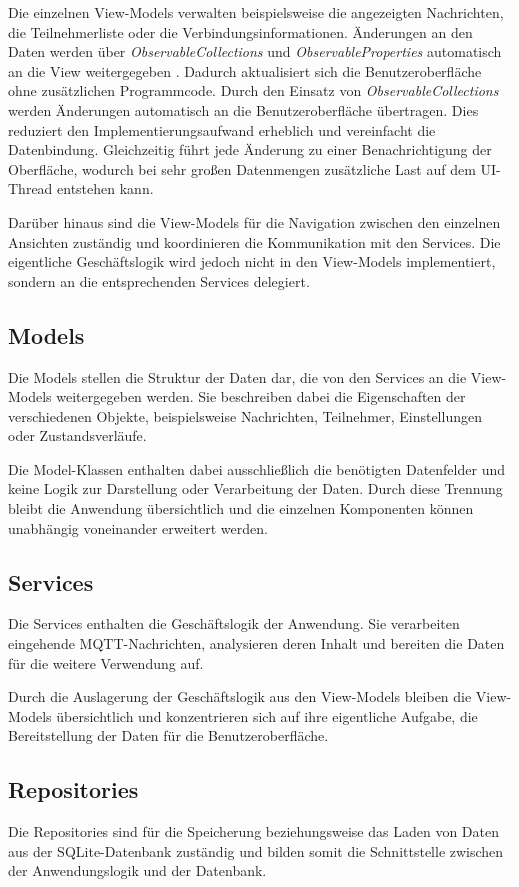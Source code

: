 Die einzelnen View-Models verwalten beispielsweise die angezeigten Nachrichten, die Teilnehmerliste oder die Verbindungsinformationen. Änderungen an den Daten werden über \textit{ObservableCollections} und \textit{ObservableProperties} automatisch an die View weitergegeben \autocite{sergio0694EinfuehrungMVVMToolkitCommunity}. Dadurch aktualisiert sich die Benutzeroberfläche ohne zusätzlichen Programmcode.
Durch den Einsatz von \textit{ObservableCollections} werden Änderungen automatisch an die Benutzeroberfläche übertragen. Dies reduziert den Implementierungsaufwand erheblich und vereinfacht die Datenbindung. Gleichzeitig führt jede Änderung zu einer Benachrichtigung der Oberfläche, wodurch bei sehr großen Datenmengen zusätzliche Last auf dem UI-Thread entstehen kann.

Darüber hinaus sind die View-Models für die Navigation zwischen den einzelnen Ansichten zuständig und koordinieren die Kommunikation mit den Services. Die eigentliche Geschäftslogik wird jedoch nicht in den View-Models implementiert, sondern an die entsprechenden Services delegiert.
\subsection{Models}
Die Models stellen die Struktur der Daten dar, die von den Services an die View-Models weitergegeben werden. Sie beschreiben dabei die Eigenschaften der verschiedenen Objekte, beispielsweise Nachrichten, Teilnehmer, Einstellungen oder Zustandsverläufe. 

Die Model-Klassen enthalten dabei ausschließlich die benötigten Datenfelder und keine Logik zur Darstellung oder Verarbeitung der Daten. Durch diese Trennung bleibt die Anwendung übersichtlich und die einzelnen Komponenten können unabhängig voneinander erweitert werden.
\subsection{Services}
Die Services enthalten die Geschäftslogik der Anwendung. Sie verarbeiten eingehende MQTT-Nachrichten, analysieren deren Inhalt und bereiten die Daten für die weitere Verwendung auf. 

Durch die Auslagerung der Geschäftslogik aus den View-Models bleiben die View-Models übersichtlich und konzentrieren sich auf ihre eigentliche Aufgabe, die Bereitstellung der Daten für die Benutzeroberfläche.
\subsection{Repositories}
Die Repositories sind für die Speicherung beziehungsweise das Laden von Daten aus der SQLite-Datenbank zuständig und bilden somit die Schnittstelle zwischen der Anwendungslogik und der Datenbank. 

